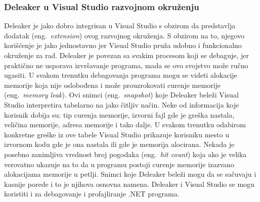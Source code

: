 \documentclass[a4paper]{article}
\begin{document}
\subsubsection{Deleaker u Visual Studio razvojnom okruženju}
Deleaker je jako dobro integrisan u Visual Studio s obzirom da predstavlja dodatak (eng.~{\em extension}) ovog razvojnog okruženja. S obzirom na to, njegovo korišćenje je jako jednostavno jer Visual Studio pruža udobno i funkcionalno okruženje za rad. Deleaker je povezan sa svakim procesom koji se debaguje, jer praktično ne usporava izvršavanje programa, mada se ovo svojstvo može ručno ugasiti. U svakom trenutku debagovanja programa mogu se videti alokacije memorije koja nije oslobođena i može prouzrokovati curenje memorije (eng.~{\em memory leak}). Ovi snimci (eng.~{\em snapshot}) koje Deleaker beleži Visual Studio interpretira tabelarno na jako čitljiv način. Neke od informacija koje korisnik dobija su: tip curenja memorije, izvorni fajl gde je greška nastala, veličina memorije, adresa memorije i tako dalje. U svakom trenutku odabirom konkretne greške iz ove tabele Visual Studio prikazuje korisniku mesto u izvornom kodu gde je ona nastala ili gde je memorija alocirana. Nekada je posebno zanimljiva vrednost broj pogodaka (eng.~{\em hit count}) koja ako je velika verovatno ukazuje na to da u programu postoji curenje memorije izazvano alokacijama memorije u petlji. Snimci koje Deleaker beleži mogu da se sačuvaju i kasnije porede i to je njihova osnovna namena. Deleaker i Visual Studio se mogu koristiti i za debagovanje i profajliranje .NET programa.\cite{deleaker-tutorial} 
\end{document}
